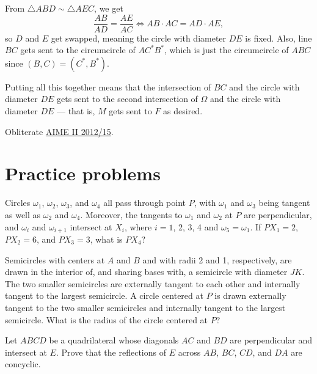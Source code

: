 \documentclass{scrartcl}
\begin{document}
From $\triangle ABD\sim\triangle AEC$, we get
\[\frac{AB}{AD} = \frac{AE}{AC}\iff AB\cdot AC = AD\cdot AE,\]
so $D$ and $E$ get swapped, meaning the circle with diameter $DE$ is fixed.
Also, line $BC$ gets sent to the circumcircle of $AC^\ast B^\ast$,
which is just the circumcircle of $ABC$ since $(B, C) = (C^\ast, B^\ast)$.

Putting all this together means that the intersection of $BC$ and
the circle with diameter $DE$ gets sent to
the second intersection of $\Omega$ and the circle with diameter $DE$ ---
that is, $M$ gets sent to $F$ as desired.

\begin{exercise}
	Obliterate
	\href{https://artofproblemsolving.com/wiki/index.php/2012_AIME_II_Problems}
	{AIME II 2012/15}.
\end{exercise}


\pagebreak

\section{Practice problems}

\begin{problem}[By me!]
	Circles $\omega_1$, $\omega_2$, $\omega_3$, and $\omega_4$
	all pass through point $P$, with $\omega_1$ and $\omega_3$
	being tangent as well as $\omega_2$ and $\omega_4$.
	Moreover, the tangents to $\omega_1$ and $\omega_2$ at $P$
	are perpendicular,
	and $\omega_i$ and $\omega_{i+1}$ intersect at $X_i$, where
	$i = 1$, 2, 3, 4 and $\omega_5 = \omega_1$.
	If $PX_1 = 2$, $PX_2 = 6$, and $PX_3 = 3$, what is $PX_4$?
\end{problem}

\begin{problem}[AMC 12A 2017/16]
	Semicircles with centers at $A$ and $B$ and with radii 2 and 1,
	respectively, are drawn in the interior of, and sharing bases with, a
	semicircle with diameter $JK$. The two smaller semicircles are externally
	tangent to each other and internally tangent to the largest semicircle. A
	circle centered at $P$ is drawn externally tangent to the two smaller
	semicircles and internally tangent to the largest semicircle. What is the
	radius of the circle centered at $P$?
\end{problem}

\begin{problem}[USAMO 1993/2]
	Let $ABCD$ be a quadrilateral whose diagonals $AC$ and $BD$
	are perpendicular and intersect at $E$.
	Prove that the reflections of $E$ across
	$AB$, $BC$, $CD$, and $DA$ are concyclic.
\end{problem}
\end{document}
